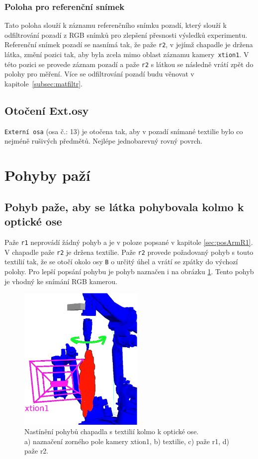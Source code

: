 \documentclass[10pt,a4paper,titlepage,oneside]{report}
\begin{document}
\subsubsection{Poloha pro referenční snímek}
\label{subsec:refRGB}
Tato poloha slouží k záznamu referenčního snímku pozadí, který slouží k odfiltrování pozadí z RGB snímků pro zlepšení přesnosti výsledků experimentu. Referenční snímek pozadí se nasnímá tak, že paže \verb|r2|, v jejímž chapadle je držena látka, změní pozici tak, aby byla zcela mimo oblast záznamu kamery~\verb|xtion1|. V této pozici se provede záznam pozadí a paže \verb|r2| s látkou se následně vrátí zpět do polohy pro měření. Více se odfiltrování pozadí budu věnovat v kapitole~\ref{subsec:matfiltr}.

\subsection{Otočení Ext.osy}
\verb|Externí osa| (osa č.: 13) je otočena tak, aby v pozadí snímané textilie bylo co nejméně rušivých předmětů. Nejlépe jednobarevný rovný povrch.

\section{Pohyby paží}
\label{sec:moveArm}

\subsection{Pohyb paže, aby se látka pohybovala kolmo k optické ose}
Paže \verb|r1| neprovádí žádný pohyb a je v poloze popsané v kapitole \ref{sec:posArmR1}. V chapadle paže \verb|r2| je držena textilie. Paže \verb|r2| provede požadovaný pohyb s touto textilií tak, že se otočí okolo osy \verb|B| o určitý úhel a vrátí se zpátky do výchozí polohy. Pro lepší popsání pohybu je pohyb naznačen i na obrázku \ref{fig:kolmoOptOsy}. Tento pohyb je vhodný ke snímání RGB kamerou.
\\
\begin{figure}[H]
	\centering  	
  	\includegraphics[height=7cm]{pictures/move1.eps}
  	\caption{Nastínění pohybů chapadla s textilií kolmo k optické ose.\\
  	a) naznačení zorného pole kamery xtion1, b) textilie, c) paže r1, d) paže r2.
  	}
  	\label{fig:kolmoOptOsy}
\end{figure}
\end{document}
